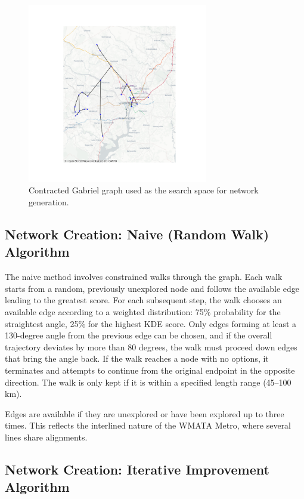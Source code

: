 \documentclass[manuscript,nonacm]{acmart}
\begin{document}
\begin{figure}[h]
    \centering
    \includegraphics[width=0.7\textwidth]{img/network_map_contracted.png}
    \caption{Contracted Gabriel graph used as the search space for network generation.}
    \label{fig:contractedgraph}
\end{figure}

\subsection{Network Creation: Naive (Random Walk) Algorithm}

The naive method involves constrained walks through the graph. Each walk starts from a random, previously unexplored node and follows the available edge leading to the greatest score. For each subsequent step, the walk chooses an available edge according to a weighted distribution: 75\% probability for the straightest angle, 25\% for the highest KDE score. Only edges forming at least a 130-degree angle from the previous edge can be chosen, and if the overall trajectory deviates by more than 80 degrees, the walk must proceed down edges that bring the angle back. If the walk reaches a node with no options, it terminates and attempts to continue from the original endpoint in the opposite direction. The walk is only kept if it is within a specified length range (45--100 km).

Edges are available if they are unexplored or have been explored up to three times. This reflects the interlined nature of the WMATA Metro, where several lines share alignments.

\subsection{Network Creation: Iterative Improvement Algorithm}
\end{document}
